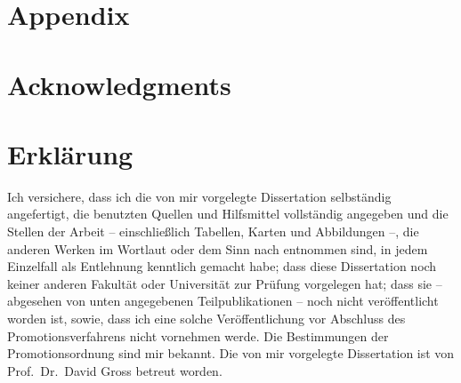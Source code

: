\documentclass[a4paper,11pt,BCOR=8mm,twoside,headsepline]{scrbook}
\makeatletter
\renewcommand{\todo}[2][]{\tikzexternaldisable\@todo[noline,#1]{#2}\tikzexternalenable}
\makeatother
\begin{document}
\todo[inline]{TODO}

\tableofcontents
\newpage
\makeatletter
\providecommand\@dotsep{5}
\makeatother
\listoftodos\relax
\newpage

\mainmatter







\appendix

\chapter{Appendix}%




\printbibliography[heading=bibintoc]


\chapter*{Acknowledgments}

\chapter*{Erklärung}

Ich versichere, dass ich die von mir vorgelegte Dissertation selbständig angefertigt, die benutzten Quellen und Hilfsmittel vollständig angegeben und die Stellen der Arbeit -- einschließlich Tabellen, Karten und Abbildungen --, die anderen Werken im Wortlaut oder dem Sinn nach entnommen sind, in jedem Einzelfall als Entlehnung kenntlich gemacht habe; dass diese Dissertation noch keiner anderen Fakultät oder Universität zur Prüfung vorgelegen hat; dass sie -- abgesehen von unten angegebenen Teilpublikationen -- noch nicht veröffentlicht worden ist, sowie, dass ich eine solche Veröffentlichung vor Abschluss des Promotionsverfahrens nicht vornehmen werde.
Die Bestimmungen der Promotionsordnung sind mir bekannt.
Die von mir vorgelegte Dissertation ist von Prof.\ Dr.\ David Gross betreut worden.
\end{document}
